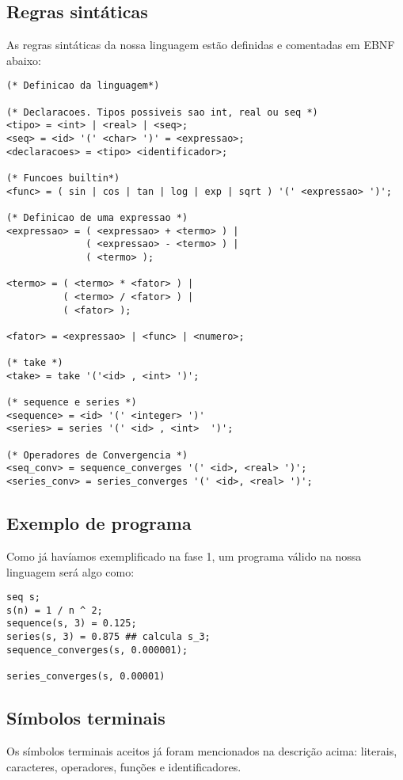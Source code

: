 \documentclass[a4 paper, 12pt]{article}
\begin{document}
\subsection{Regras sint\'aticas}
As regras sint\'aticas da nossa linguagem est\~ao definidas e
comentadas em EBNF abaixo:
\begin{verbatim}
(* Definicao da linguagem*)

(* Declaracoes. Tipos possiveis sao int, real ou seq *)
<tipo> = <int> | <real> | <seq>;
<seq> = <id> '(' <char> ')' = <expressao>;
<declaracoes> = <tipo> <identificador>;

(* Funcoes builtin*)
<func> = ( sin | cos | tan | log | exp | sqrt ) '(' <expressao> ')';

(* Definicao de uma expressao *)
<expressao> = ( <expressao> + <termo> ) |
              ( <expressao> - <termo> ) |
              ( <termo> );

<termo> = ( <termo> * <fator> ) |
          ( <termo> / <fator> ) |
          ( <fator> );

<fator> = <expressao> | <func> | <numero>;

(* take *)
<take> = take '('<id> , <int> ')';

(* sequence e series *)
<sequence> = <id> '(' <integer> ')'
<series> = series '(' <id> , <int>  ')';

(* Operadores de Convergencia *)
<seq_conv> = sequence_converges '(' <id>, <real> ')';
<series_conv> = series_converges '(' <id>, <real> ')';
\end{verbatim}

\subsection{Exemplo de programa}
Como j\'a hav\'iamos exemplificado na fase 1, um programa v\'alido na
nossa linguagem ser\'a algo como:
\begin{verbatim}
seq s;
s(n) = 1 / n ^ 2;
sequence(s, 3) = 0.125;
series(s, 3) = 0.875 ## calcula s_3;
sequence_converges(s, 0.000001);

series_converges(s, 0.00001)
\end{verbatim}

\subsection{S\'imbolos terminais}
Os s\'imbolos terminais aceitos j\'a foram mencionados na descri\c
c\~ao acima: literais, caracteres, operadores, fun\c c\~oes e
identificadores.
\end{document}
